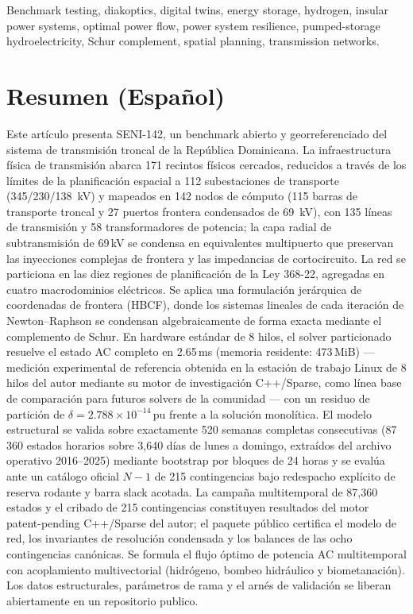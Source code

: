 \documentclass[10pt, journal]{IEEEtran}
\begin{document}
\begin{IEEEkeywords}
Benchmark testing, diakoptics, digital twins, energy storage, hydrogen, insular power systems, optimal power flow, power system resilience, pumped-storage hydroelectricity, Schur complement, spatial planning, transmission networks.
\end{IEEEkeywords}

\vspace{6pt}
\section*{Resumen (Espa\~nol)}
\noindent Este artículo presenta SENI-142, un benchmark abierto y georreferenciado del sistema de transmisión troncal de la República Dominicana. La infraestructura física de transmisión abarca 171 recintos físicos cercados, reducidos a través de los límites de la planificación espacial a 112 subestaciones de transporte (345/230/138~kV) y mapeados en 142 nodos de cómputo (115 barras de transporte troncal y 27 puertos frontera condensados de 69~kV), con 135 líneas de transmisión y 58 transformadores de potencia; la capa radial de subtransmisión de 69\,kV se condensa en equivalentes multipuerto que preservan las inyecciones complejas de frontera y las impedancias de cortocircuito. La red se particiona en las diez regiones de planificación de la Ley 368-22, agregadas en cuatro macrodominios eléctricos. Se aplica una formulación jerárquica de coordenadas de frontera (HBCF), donde los sistemas lineales de cada iteración de Newton--Raphson se condensan algebraicamente de forma exacta mediante el complemento de Schur. En hardware estándar de 8 hilos, el solver particionado resuelve el estado AC completo en 2.65\,ms (memoria residente: 473\,MiB) --- medición experimental de referencia obtenida en la estación de trabajo Linux de 8 hilos del autor mediante su motor de investigación C++/Sparse, como línea base de comparación para futuros solvers de la comunidad --- con un residuo de partición de $\delta = 2.788 \times 10^{-14}$\,pu frente a la solución monolítica. El modelo estructural se valida sobre exactamente 520 semanas completas consecutivas (87\,360 estados horarios sobre 3,640 días de lunes a domingo, extraídos del archivo operativo 2016--2025) mediante bootstrap por bloques de 24 horas y se evalúa ante un catálogo oficial $N-1$ de 215 contingencias bajo redespacho explícito de reserva rodante y barra slack acotada. La campaña multitemporal de 87,360 estados y el cribado de 215 contingencias constituyen resultados del motor patent-pending C++/Sparse del autor; el paquete público certifica el modelo de red, los invariantes de resolución condensada y los balances de las ocho contingencias canónicas. Se formula el flujo óptimo de potencia AC multitemporal con acoplamiento multivectorial (hidrógeno, bombeo hidráulico y biometanación). Los datos estructurales, parámetros de rama y el arnés de validación se liberan abiertamente en un repositorio publico.
\end{document}
